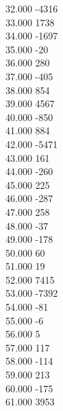 { 32.000	-4316 \\
 33.000	1738 \\
 34.000	-1697 \\
 35.000	-20 \\
 36.000	280 \\
 37.000	-405 \\
 38.000	854 \\
 39.000	4567 \\
 40.000	-850 \\
 41.000	884 \\
 42.000	-5471 \\
 43.000	161 \\
 44.000	-260 \\
 45.000	225 \\
 46.000	-287 \\
 47.000	258 \\
 48.000	-37 \\
 49.000	-178 \\
 50.000	60 \\
 51.000	19 \\
 52.000	7415 \\
 53.000	-7392 \\
 54.000	-81 \\
 55.000	-6 \\
 56.000	5 \\
 57.000	117 \\
 58.000	-114 \\
 59.000	213 \\
 60.000	-175 \\
 61.000	3953 \\
}

